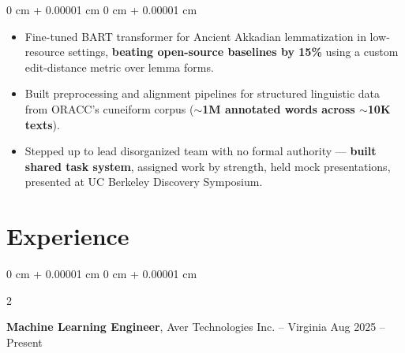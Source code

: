 \documentclass[10pt, letterpaper]{article}
\newenvironment{highlights}{
    \begin{itemize}[
        topsep=0.3 cm,
        parsep=0.05 cm,
        partopsep=0pt,
        itemsep=0.02 cm,
        leftmargin=0 cm + 10pt
    ]
}{
    \end{itemize}
} %
\newenvironment{onecolentry}{
    \begin{adjustwidth}{
        0 cm + 0.00001 cm
    }{
        0 cm + 0.00001 cm
    }
}{
    \end{adjustwidth}
} %
\newenvironment{twocolentry}[2][]{
    \onecolentry
    \def\secondColumn{#2}
    \setcolumnwidth{\fill, 4.5 cm}
    \begin{paracol}{2}
}{
    \switchcolumn \raggedleft \secondColumn
    \end{paracol}
    \endonecolentry
} %
\begin{document}
        \vspace{0.10 cm}
        \begin{onecolentry}
            \begin{highlights}
                \item Fine-tuned BART transformer for Ancient Akkadian lemmatization in low-resource settings, \textbf{beating open-source baselines by 15\%} using a custom edit-distance metric over lemma forms.
                \item Built preprocessing and alignment pipelines for structured linguistic data from ORACC's cuneiform corpus (\textbf{$\sim$1M annotated words across $\sim$10K texts}).
                \item Stepped up to lead disorganized team with no formal authority — \textbf{built shared task system}, assigned work by strength, held mock presentations, presented at UC Berkeley Discovery Symposium.
            \end{highlights}
        \end{onecolentry}

    \section{Experience}
        \begin{twocolentry}{
            Aug 2025 – Present
        }
            \textbf{Machine Learning Engineer}, Aver Technologies Inc. -- Virginia\end{twocolentry}
\end{document}
